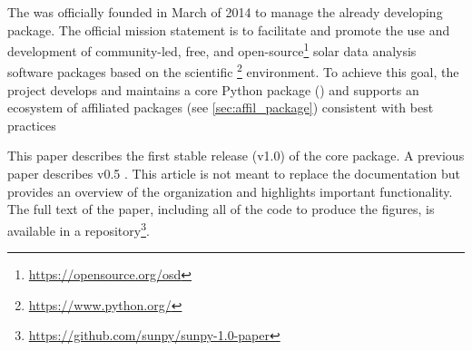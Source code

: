 The \sunpyproj was officially founded in March of 2014 to manage the already developing \sunpypkg package.
The official mission statement is to facilitate and promote the use and development of community-led, free, and open-source\footnote{\url{https://opensource.org/osd}} solar data analysis software packages based on the scientific \python\footnote{\url{https://www.python.org/}} environment.
To achieve this goal, the project develops and maintains a core Python package (\sunpypkg) and supports an ecosystem of affiliated packages (see \autoref{sec:affil_package}) consistent with best practices \citep{Wilson:2014cka}

This paper describes the first stable release (v1.0) of the core package.
A previous paper describes v0.5 \citep{Community:2015cy}.
This article is not meant to replace the \sunpypkg documentation but provides an overview of the organization and highlights important functionality.
The full text of the paper, including all of the code to produce the figures, is available in a \github repository\footnote{\url{https://github.com/sunpy/sunpy-1.0-paper}}.
